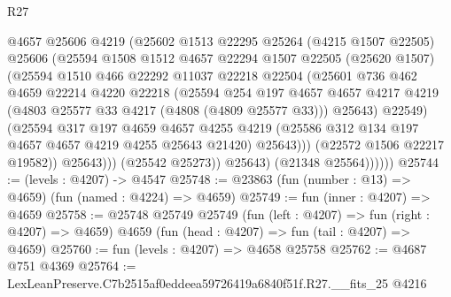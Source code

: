 \begin{lexlean}{R27}
\begin{coremodule}
                        @4657
                        @25606
                        @4219
                        (@25602
                          @1513
                          @22295
                          @25264
                          (@4215 @1507 @22505)
                          @25606
                          (@25594
                            @1508
                            @1512
                            @4657
                            @22294
                            @1507
                            @22505
                            (@25620 @1507)
                            (@25594
                              @1510
                              @466
                              @22292
                              @11037
                              @22218
                              @22504
                              (@25601
                                @736
                                @462
                                @4659
                                @22214
                                @4220
                                @22218
                                (@25594
                                  @254
                                  @197
                                  @4657
                                  @4657
                                  @4217
                                  @4219
                                  (@4803 @25577 @33 @4217 (@4808 (@4809 @25577 @33)))
                                  @25643)
                                @22549)
                              (@25594
                                @317
                                @197
                                @4659
                                @4657
                                @4255
                                @4219
                                (@25586 @312 @134 @197 @4657 @4657 @4219 @4255 @25643 @21420)
                                @25643)))
                          (@22572 @1506 @22217 @19582))
                        @25643)))
                  (@25542 @25273))
                @25643)
              (@21348 @25564))))))
@25744 := (levels : @4207) -> @4547
@25748 := @23863 (fun (number : @13) => @4659) (fun (named : @4224) => @4659)
@25749 := fun (inner : @4207) => @4659
@25758 := @25748
    @25749
    @25749
    (fun (left : @4207) => fun (right : @4207) => @4659)
    @4659
    (fun (head : @4207) => fun (tail : @4207) => @4659)
@25760 := fun (levels : @4207) => @4658 @25758
@25762 := @4687 @751 @4369
@25764 := LexLeanPreserve.C7b2515af0eddeea59726419a6840f51f.R27.__fits_25 @4216

\end{coremodule}
\end{lexlean}
